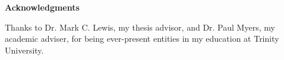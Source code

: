 %
%
\begin{center}

\bigskip

\begin{Large}
\textbf{Acknowledgments}
\end{Large}

\bigskip

\end{center}

Thanks to Dr. Mark C. Lewis, my thesis advisor, and Dr. Paul Myers, my academic adviser, for being ever-present entities in my education at Trinity University.

